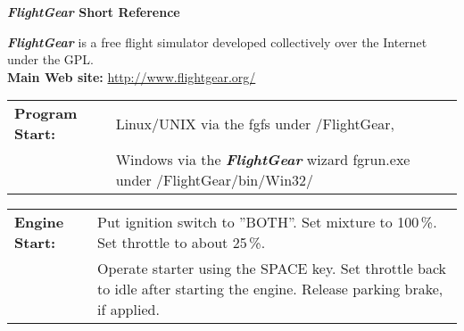 \documentclass[10pt]{article}
\newcommand{\FlightGear}{{\itshape\bfseries FlightGear}}
\newcommand{\web}[1]{\href{#1}{#1}}
\newcommand{\longpage}{\enlargethispage{\baselineskip}}
\begin{document}
\longpage

\centerline{\large \textbf{\FlightGear{} Short Reference}}
\medskip

\scriptsize \noindent
 \FlightGear{} is a free flight simulator developed collectively over the
 Internet under the GPL.\\

 \noindent
 \textbf{Main Web site:} \web{http://www.flightgear.org/}
 \medskip

 \hspace*{-8mm}
\begin{tabular}{ll}
\textbf{Program Start:}  & Linux/UNIX via the fgfs under /FlightGear,\\
                         & Windows via the \FlightGear{} wizard fgrun.exe under /FlightGear/bin/Win32/
\end{tabular}
 \medskip

\hspace*{-8mm}
\begin{tabular}{ll}
\textbf{Engine Start:}  & Put ignition switch to ''BOTH''. Set mixture to 100\,\%. Set throttle to about 25\,\%.\\
                        & Operate starter using the SPACE key. Set throttle back to idle after starting the engine. Release parking brake, if applied.
\end{tabular}
\medskip
\end{document}
